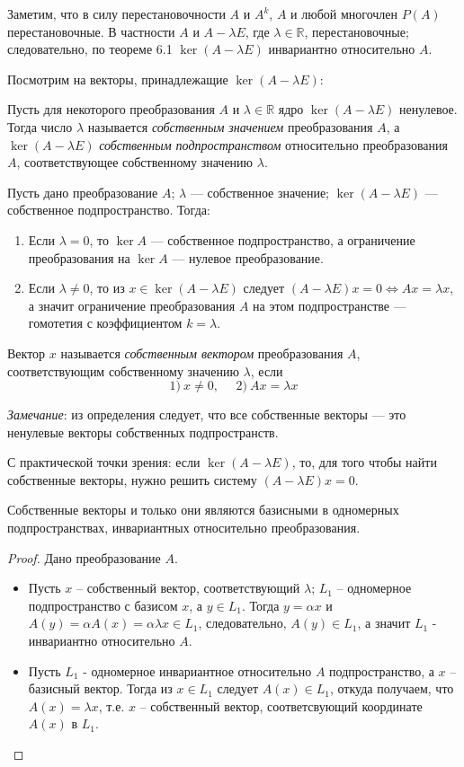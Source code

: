 Заметим, что в силу перестановочности $A$ и $A^k$, $A$ и любой многочлен $P(A)$ перестановочные. В частности $A$ и $A-\lambda E$, где $\lambda \in \mathbb{R}$, перестановочные; следовательно, по теореме 6.1 $\ker (A-\lambda E)$ инвариантно относительно $A$.

Посмотрим на векторы, принадлежащие $\ker (A-\lambda E)$:
\begin{definition}
    Пусть для некоторого преобразования $A$ и $\lambda \in \mathbb{R}$ ядро $\ker (A-\lambda E)$ ненулевое. Тогда число $\lambda$ называется \textit{собственным значением} преобразования $A$, а $\ker( A-\lambda E)$ \textit{собственным подпространством} относительно преобразования $A$, соответствующее собственному значению $\lambda$.
\end{definition}
Пусть дано преобразование $A$; $\lambda$ — собственное значение; $\ker (A-\lambda E)$ — собственное подпространство. Тогда: 
\begin{enumerate}
    \item Если $\lambda = 0$, то $\ker A$ — собственное подпространство, а ограничение преобразования на $\ker A$ — нулевое преобразование.
    \item Если $\lambda \neq 0$, то из $x \in \ker (A-\lambda E)$ следует $(A-\lambda E)x=0 \Leftrightarrow Ax=\lambda x$, а значит ограничение преобразования $A$ на этом подпространстве — гомотетия с коэффициентом $k=\lambda$.
\end{enumerate}

\begin{definition}
    Вектор $x$ называется \textit{собственным вектором} преобразования $A$, соответствующим собственному значению $\lambda$, если 
    $$
    1) \ x \neq 0, \ \ \ \ \ \  2) \ Ax=\lambda x
    $$
\end{definition}
\textit{Замечание}: из определения следует, что все собственные векторы — это ненулевые векторы собственных подпространств.

С практической точки зрения: если $\ker( A-\lambda E)$, то, для того чтобы найти собственные векторы, нужно решить систему $( A-\lambda E)x=0$.
\begin{theorem}
    Собственные векторы и только они являются базисными в одномерных подпространствах, инвариантных относительно преобразования.
\end{theorem}
\begin{proof}
Дано преобразование $A$.
    \begin{itemize}
        \item Пусть $x$ -- собственный вектор, соответствующий $\lambda$; $L_1$ -- одномерное подпространство с базисом $x$, а $y \in L_1$. Тогда $y=\alpha x$ и $A(y)=\alpha A(x)=\alpha \lambda x \in L_1$, следовательно, $A(y) \in L_1$, а значит $L_1$ - инвариантно относительно  $A$.
        \item Пусть $L_1$ - одномерное инвариантное относительно $A$ подпространство, а $x$ -- базисный вектор. Тогда из $x \in L_1$ следует $A(x)\in L_1$, откуда получаем, что $A(x)=\lambda x$, т.е. $x$ -- собственный вектор, соответсвующий координате $A(x)$ в $L_1$. 
    \end{itemize}
\end{proof}

